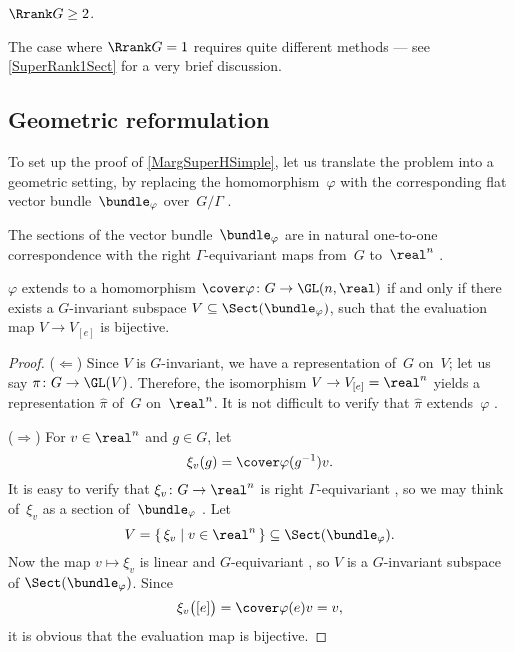 \begin{assump} \label{MargSuperRrankAssump}
$\Rrank G \ge 2$.
\end{assump}

The case where $\Rrank G = 1$ requires quite different methods --- see \cref{SuperRank1Sect} for a very brief discussion.

\subsection{Geometric reformulation}
To set up the proof of \cref{MargSuperHSimple}, let us translate the problem into a geometric setting, by replacing the homomorphism~$\varphi$ with the corresponding flat vector bundle~$\bundle_\varphi$ over~$G/\Gamma$ .

\begin{rem} \label{pfsuper-sect<>equi}
The sections of the vector bundle~$\bundle_\varphi$ are in natural one-to-one correspondence with the right $\Gamma$-equivariant maps from~$G$ to~$\real^n$ .
\end{rem}

\begin{lem} \label{Extend<>SectionBij}
$\varphi$ extends to a homomorphism $\cover\varphi \colon G \to \GL(n,\real)$ if and only if there exists a $G$-invariant subspace $V \subseteq \Sect(\bundle_\varphi)$, such that the evaluation map $V \to V_{[e]}$ is bijective.
\end{lem}

\begin{proof}
($\Leftarrow$) Since $V$ is $G$-invariant, we have a representation of~$G$ on~$V$; let us say $\pi \colon G \to \GL(V)$. Therefore, the isomorphism $V \to V_{[e]} = \real^n$ yields a representation $\widehat\pi$ of~$G$ on~$\real^n$. It is not difficult to verify that $\widehat\pi$ extends~$\varphi$ .

($\Rightarrow$) For $v \in \real^n$ and $g \in G$, let 
	$$\xi_v(g) = \cover\varphi(g^{-1}) v .$$
It is easy to verify that $\xi_v \colon G \to \real^n$ is right $\Gamma$-equivariant , so we may think of~$\xi_v$ as a section of~$\bundle_\varphi$ . Let 
	$$V = \{\, \xi_v \mid v \in \real^n\,\} \subseteq \Sect(\bundle_\varphi) .$$
Now the map $v \mapsto \xi_v$ is linear and $G$-equivariant , so $V$ is a $G$-invariant subspace of $\Sect(\bundle_\varphi)$. Since 
	$$ \xi_v \bigl( [e] \bigr) = \cover\varphi(e) v = v ,$$
it is obvious that the evaluation map is bijective.
\end{proof}

